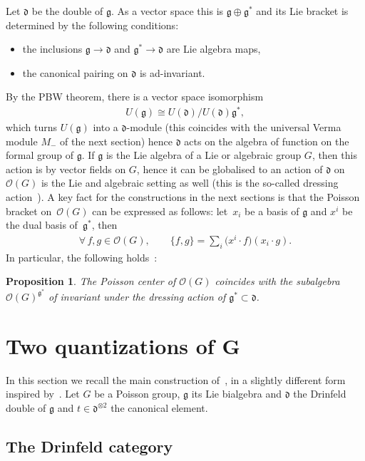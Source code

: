 \documentclass[11pt]{article}
\numberwithin{equation}{section}
\newcommand{\mf}[1]{\mathfrak{#1}}
\newcommand{\ot}{\otimes}
\newcommand{\cO}{\mathcal O}
\newtheorem{prop}[thm]{Proposition}
\theoremstyle{definition}
\begin{document}
Let $\mf d$ be the double of $\mf g$. As a vector space this is $\mf g \oplus \mf g^*$ and its Lie bracket is determined by the following conditions:
\begin{itemize}\itemsep=0pt
	\item the inclusions $\mf g\rightarrow \mf d$ and $\mf g^* \rightarrow \mf d$ are Lie algebra maps,
	\item the canonical pairing on $\mf d$ is ad-invariant.
\end{itemize}

By the PBW theorem, there is a vector space isomorphism
\begin{gather*}
	U(\mf g)\cong U(\mf d)/U(\mf d)\mf g^*,
\end{gather*}
which turns $U(\mf g)$ into a $\mf d$-module (this coincides with the universal Verma module $M_-$ of the next section) hence $\mf d$ acts on the algebra of function on the formal group of $\mf g$. If $\mf g$ is the Lie algebra of a Lie or algebraic group $G$, then this action is by vector f\/ields on $G$, hence it can be globalised to an action of $\mf d$ on $\cO(G)$ is the Lie and algebraic setting as well (this is the so-called dressing action~\cite{Semenov-Tian-Shansky1985}). A key fact for the constructions in the next sections is that the Poisson bracket on~$\cO(G)$ can be expressed as follows: let~$x_i$ be a basis of $\mf g$ and $x^i$ be the dual basis of~$\mf g^*$, then
\begin{gather*}
	\forall\, f,g \in \cO(G),\qquad \{f,g\}=\sum_i \big(x^i\cdot f\big)(x_i\cdot g).
\end{gather*}
In particular, the following holds~\cite{Semenov-Tian-Shansky1985}:
\begin{prop}\label{prop:dressing}
The Poisson center of $\cO(G)$ coincides with the subalgebra $\cO(G)^{\mf g^*}$ of invariant under the dressing action of $\mf g^* \subset \mf d$.
\end{prop}

\section[Two quantizations of $G$]{Two quantizations of $\boldsymbol{G}$}
In this section we recall the main construction of~\cite{Etingof1996}, in a slightly dif\/ferent form inspired by~\cite{Severa2016}. Let $G$ be a Poisson group, $\mf g$ its Lie bialgebra and $\mf d$ the Drinfeld double of $\mf g$ and $t \in \mf d^{\ot 2}$ the canonical element.

\subsection{The Drinfeld category}
\end{document}
